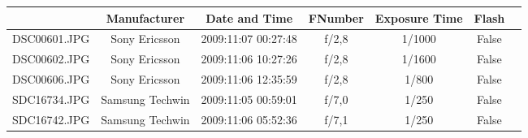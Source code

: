 \resizebox{13 cm}{!} {
\begin{tabular}{|c|c|c|c|c|c|c|}
\hline  & Manufacturer & Date and Time & FNumber & Exposure Time & Flash \\ 
\hline  DSC00601.JPG & Sony Ericsson   & 2009:11:07 00:27:48  & f/2,8 & 1/1000 & False\\ 
\hline  DSC00602.JPG & Sony Ericsson & 2009:11:06 10:27:26 & f/2,8  & 1/1600 & False \\ 
\hline  DSC00606.JPG & Sony Ericsson & 2009:11:06 12:35:59 & f/2,8  & 1/800 & False \\ 
\hline  SDC16734.JPG & Samsung Techwin & 2009:11:05 00:59:01   & f/7,0 & 1/250 & False\\ 
\hline  SDC16742.JPG & Samsung Techwin & 2009:11:06 05:52:36   & f/7,1 & 1/250 & False\\ 
\hline 
\end{tabular} 

}